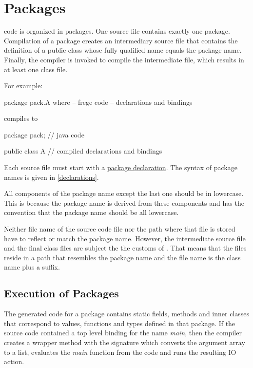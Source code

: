 

\chapter{Packages} \label{packages} 

\frege{} code is organized in packages. One source file contains
exactly one package. Compilation of a package creates an  intermediary \java{}
source file that contains the definition of a public class whose fully qualified name equals the \frege{} package name. Finally, the \java{} compiler is invoked to compile the intermediate file, which results in at least one class file.

For example:

\begin{code}
package pack.A where  -- frege code
-- declarations and bindings
\end{code}

compiles to

\begin{code}
package pack;        // java code

public class A {
    // compiled declarations and bindings
}
\end{code}


Each source file must start with a \hyperref[packagedcl]{package declaration}.
The syntax of package names is given in \autoref{declarations}.

All components of the package name
except the last one should be in lowercase. This is because the \java{}
package name is derived from these components and \java{} has the
convention that the package name should be all lowercase.

Neither file name of the \frege{} source code file nor the path where that file is stored have to reflect or match the package name. However, the intermediate \java{} source file and the final class files are subject the the customs of \java{}. That means that the files reside in a path that resembles the package name and the file name is the class name plus a suffix.

\section{Execution of \frege{} Packages} \label{execution}

The generated \java{} code for a \frege{} package contains static fields, methods and inner classes that correspond to \frege{} values, functions and types defined in that package. If the source code contained a top level binding for the name \emph{main}, then the compiler creates a wrapper method with the signature 
which converts the argument array to a list, evaluates the \emph{main} function from the \frege{} code and runs the resulting IO action. 

